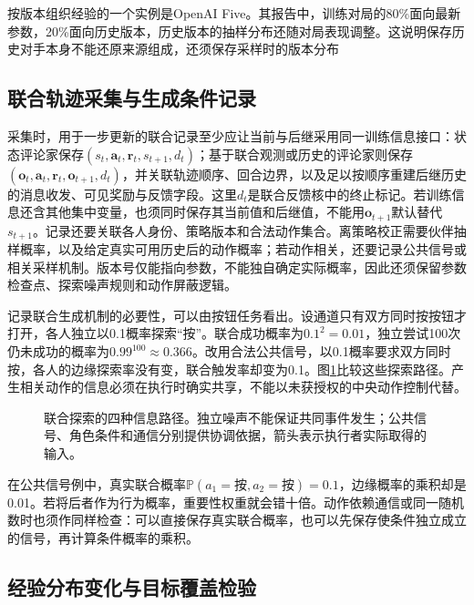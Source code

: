 按版本组织经验的一个实例是OpenAI Five。其报告中，训练对局的80\%面向最新参数，20\%面向历史版本，历史版本的抽样分布还随对局表现调整。这说明保存历史对手本身不能还原来源组成，还须保存采样时的版本分布

\subsection{联合轨迹采集与生成条件记录}
\label{sec:rl-multi-agent-records}

采集时，用于一步更新的联合记录至少应让当前与后继采用同一训练信息接口：状态评论家保存$(s_t,\bm a_t,\bm r_t,s_{t+1},d_t)$；基于联合观测或历史的评论家则保存$(\bm o_t,\bm a_t,\bm r_t,\bm o_{t+1},d_t)$，并关联轨迹顺序、回合边界，以及足以按顺序重建后继历史的消息收发、可见奖励与反馈字段。这里$d_t$是联合反馈核中的终止标记。若训练信息还含其他集中变量，也须同时保存其当前值和后继值，不能用$\bm o_{t+1}$默认替代$s_{t+1}$。记录还要关联各人身份、策略版本和合法动作集合。离策略校正需要伙伴抽样概率，以及给定真实可用历史后的动作概率；若动作相关，还要记录公共信号或相关采样机制。版本号仅能指向参数，不能独自确定实际概率，因此还须保留参数检查点、探索噪声规则和动作屏蔽逻辑。

记录联合生成机制的必要性，可以由按钮任务看出。设通道只有双方同时按按钮才打开，各人独立以0.1概率探索“按”。联合成功概率为$0.1^2=0.01$，独立尝试100次仍未成功的概率为$0.99^{100}\approx0.366$。改用合法公共信号，以0.1概率要求双方同时按，各人的边缘探索率没有变，联合触发率却变为0.1。图\ref{fig:rl-multi-agent-exploration}比较这些探索路径。产生相关动作的信息必须在执行时确实共享，不能以未获授权的中央动作控制代替。

\begin{figure}[htbp]
 \centering
 
 \caption{联合探索的四种信息路径。独立噪声不能保证共同事件发生；公共信号、角色条件和通信分别提供协调依据，箭头表示执行者实际取得的输入。}
 \label{fig:rl-multi-agent-exploration}
\end{figure}

在公共信号例中，真实联合概率$\mathbb P(a_1=\text{按},a_2=\text{按})=0.1$，边缘概率的乘积却是0.01。若将后者作为行为概率，重要性权重就会错十倍。动作依赖通信或同一随机数时也须作同样检查：可以直接保存真实联合概率，也可以先保存使条件独立成立的信号，再计算条件概率的乘积。

\subsection{经验分布变化与目标覆盖检验}
\label{sec:rl-multi-agent-coverage}

